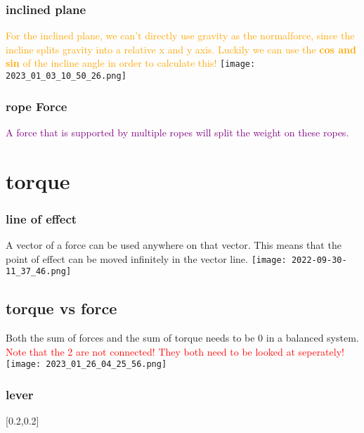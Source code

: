 \documentclass[main.tex,fontsize=8pt,paper=a4,paper=portrait,DIV=calc,]{scrartcl}
\begin{document}
\begin{multicols*}{2}
\subsubsection{inclined plane}
\textcolor{orange}{For the inclined plane, we can't directly use gravity as the normalforce, since the incline splits gravity into a relative x and y axis. 
Luckily we can use the \textbf{cos and sin} of the incline angle in order to calculate this!}\newline
\texttt{[image: 2023\_01\_03\_10\_50\_26.png]}

\subsubsection{rope Force}
\textcolor{purple}{A force that is supported by multiple ropes will split the weight on these ropes.}

\section{torque}
\subsubsection{line of effect}
A vector of a force can be used anywhere on that vector.\newline
This means that the point of effect can be moved infinitely in the vector line.\newline
\texttt{[image: 2022-09-30-11\_37\_46.png]}

\subsection{torque vs force}
Both the sum of forces and the sum of torque needs to be 0 in a balanced system. \textcolor{red}{Note that the 2 are not connected! They both need to be looked at seperately!}\newline
\texttt{[image: 2023\_01\_26\_04\_25\_56.png]}

\subsubsection{lever} 
[0.2,0.2]


\end{multicols*}
\end{document}
